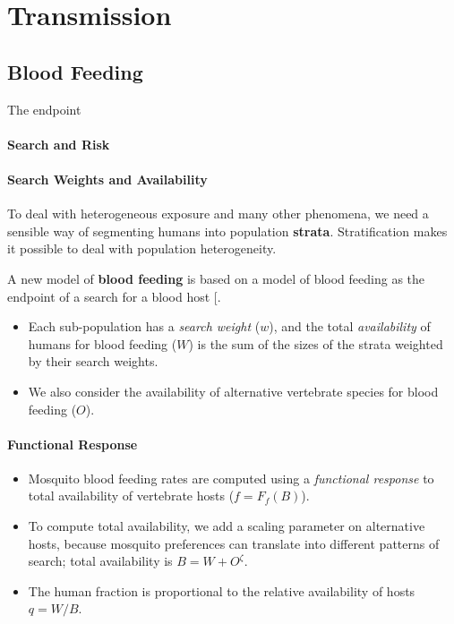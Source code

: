 \documentclass[
]{book}
\begin{document}
\section{}\label{section-2}

\part{Transmission}\label{part-transmission}

\chapter{Blood Feeding}\label{blood-feeding-1}

The endpoint

\subsection{Search and Risk}\label{search-and-risk}

\subsection{Search Weights and Availability}\label{search-weights-and-availability}

To deal with heterogeneous exposure and many other phenomena, we need a sensible way of segmenting humans into population \textbf{strata}. Stratification makes it possible to deal with population heterogeneity.

A new model of \textbf{blood feeding} is based on a model of blood feeding as the endpoint of a search for a blood host {[}\citeproc{ref-WuSL2023SpatialDynamics}{11}{]}.

\begin{itemize}
\item
  Each sub-population has a \emph{search weight} (\(w\)), and the total \emph{availability} of humans for blood feeding (\(W\)) is the sum of the sizes of the strata weighted by their search weights.
\item
  We also consider the availability of alternative vertebrate species for blood feeding (\(O\)).
\end{itemize}

\subsection{Functional Response}\label{functional-response}

\begin{itemize}
\item
  Mosquito blood feeding rates are computed using a \emph{functional response} to total availability of vertebrate hosts (\(f = F_f(B)\)).
\item
  To compute total availability, we add a scaling parameter on alternative hosts, because mosquito preferences can translate into different patterns of search; total availability is \(B=W + O^\zeta\).
\item
  The human fraction is proportional to the relative availability of hosts \(q = W/B\).
\end{itemize}
\end{document}
